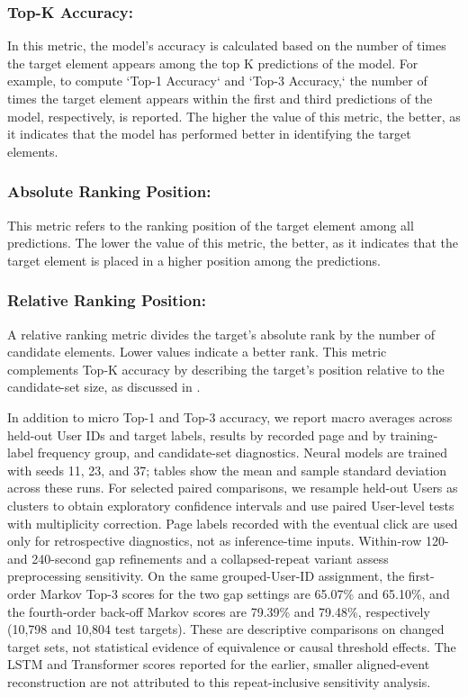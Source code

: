 \documentclass[sn-mathphys-num, Numbered]{sn-jnl}%
\theoremstyle{thmstyleone}%
\theoremstyle{thmstyletwo}%
\theoremstyle{thmstylethree}%
\begin{document}
\subsubsection{Top-K Accuracy:}
In this metric, the model's accuracy is calculated based on the number of times the target element appears among the top K predictions of the model. For example, to compute `Top-1 Accuracy` and `Top-3 Accuracy,` the number of times the target element appears within the first and third predictions of the model, respectively, is reported. The higher the value of this metric, the better, as it indicates that the model has performed better in identifying the target elements.

\subsubsection{Absolute Ranking Position:}
This metric refers to the ranking position of the target element among all predictions. The lower the value of this metric, the better, as it indicates that the target element is placed in a higher position among the predictions.

\subsubsection{Relative Ranking Position:}

A relative ranking metric divides the target's absolute rank by the number of candidate elements. Lower values indicate a better rank. This metric complements Top-K accuracy by describing the target's position relative to the candidate-set size, as discussed in \cite{zhou2021large}.

In addition to micro Top-1 and Top-3 accuracy, we report macro averages across held-out User IDs and target labels, results by recorded page and by training-label frequency group, and candidate-set diagnostics. Neural models are trained with seeds 11, 23, and 37; tables show the mean and sample standard deviation across these runs. For selected paired comparisons, we resample held-out Users as clusters to obtain exploratory confidence intervals and use paired User-level tests with multiplicity correction. Page labels recorded with the eventual click are used only for retrospective diagnostics, not as inference-time inputs. Within-row 120- and 240-second gap refinements and a collapsed-repeat variant assess preprocessing sensitivity. On the same grouped-User-ID assignment, the first-order Markov Top-3 scores for the two gap settings are 65.07\% and 65.10\%, and the fourth-order back-off Markov scores are 79.39\% and 79.48\%, respectively (10,798 and 10,804 test targets). These are descriptive comparisons on changed target sets, not statistical evidence of equivalence or causal threshold effects. The LSTM and Transformer scores reported for the earlier, smaller aligned-event reconstruction are not attributed to this repeat-inclusive sensitivity analysis.
\end{document}
